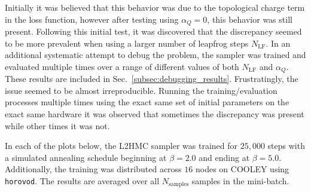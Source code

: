 \documentclass[../main.tex]{subfiles}
\begin{document}
Initially it was believed that this behavior was due to the topological charge term in the loss function, however after
testing using $\alpha_{Q} = 0$, this behavior was still present.
%
Following this initial test, it was discovered that the discrepancy seemed to be more prevalent when using a larger
number of leapfrog steps $N_{\mathrm{LF}}$.
%
In an additional systematic attempt to debug the problem, the sampler was trained and evaluated multiple times over a
range of different values of both $N_{\mathrm{LF}}$ and $\alpha_{Q}$.
%
These results are included in Sec.~\ref{subsec:debugging_results}.
%
Frustratingly, the issue seemed to be almost irreproducible.
%
Running the training/evaluation processes multiple times using the exact same set of initial parameters on the exact
same hardware it was observed that sometimes the discrepancy was present while other times it was not.
%
%


%
%
%
In each of the plots below, the L2HMC sampler was trained for $25,000$ steps with a simulated annealing schedule
beginning at $\beta = 2.0$ and ending at $\beta = 5.0$.
%
Additionally, the training was distributed across $16$ nodes on COOLEY using \texttt{horovod}.
%
The results are averaged over all $N_{\mathrm{samples}}$ samples in the
mini-batch.
\end{document}
